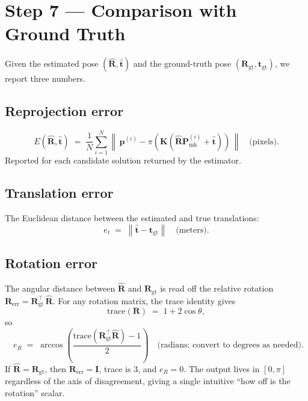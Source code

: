 \documentclass[11pt]{article}
\newcommand{\norm}[1]{\left\lVert #1 \right\rVert}
\newcommand{\Rgt}{\mathbf{R}_{\text{gt}}}
\newcommand{\tgt}{\mathbf{t}_{\text{gt}}}
\newcommand{\Pmark}{\mathbf{P}_{\text{mk}}}
\newcommand{\KK}{\mathbf{K}}
\begin{document}
\section{Step 7 --- Comparison with Ground Truth}

Given the estimated pose $(\hat{\mathbf{R}}, \hat{\mathbf{t}})$ and the ground-truth
pose $(\Rgt, \tgt)$, we report three numbers.

\subsection{Reprojection error}

\begin{equation}
  E(\hat{\mathbf{R}}, \hat{\mathbf{t}})
  \;=\; \frac{1}{N}\sum_{i=1}^{N}
  \norm{\,\mathbf{p}^{(i)} - \pi(\KK(\hat{\mathbf{R}}\Pmark^{(i)} + \hat{\mathbf{t}}))\,}
  \quad\text{(pixels)}.
\end{equation}
Reported for each candidate solution returned by the estimator.

\subsection{Translation error}

The Euclidean distance between the estimated and true translations:
\begin{equation}
  e_t \;=\; \norm{\hat{\mathbf{t}} - \tgt} \quad\text{(meters)}.
\end{equation}

\subsection{Rotation error}

The angular distance between $\hat{\mathbf{R}}$ and $\Rgt$ is read off the
relative rotation $\mathbf{R}_{\text{err}} = \Rgt^\top\,\hat{\mathbf{R}}$. For any
rotation matrix, the trace identity gives
\begin{equation}
  \mathrm{trace}(\mathbf{R}) \;=\; 1 + 2\cos\theta,
\end{equation}
so
\begin{equation}
  \boxed{\quad
    e_R \;=\; \arccos\!\left(\frac{\mathrm{trace}(\Rgt^\top \hat{\mathbf{R}}) - 1}{2}\right)
  \quad\text{(radians; convert to degrees as needed)}.
  \quad}
  \label{eq:rot-error}
\end{equation}
If $\hat{\mathbf{R}} = \Rgt$, then $\mathbf{R}_{\text{err}} = \mathbf{I}$, trace is $3$, and
$e_R = 0$. The output lives in $[0, \pi]$ regardless of the axis of
disagreement, giving a single intuitive ``how off is the rotation'' scalar.
\end{document}
